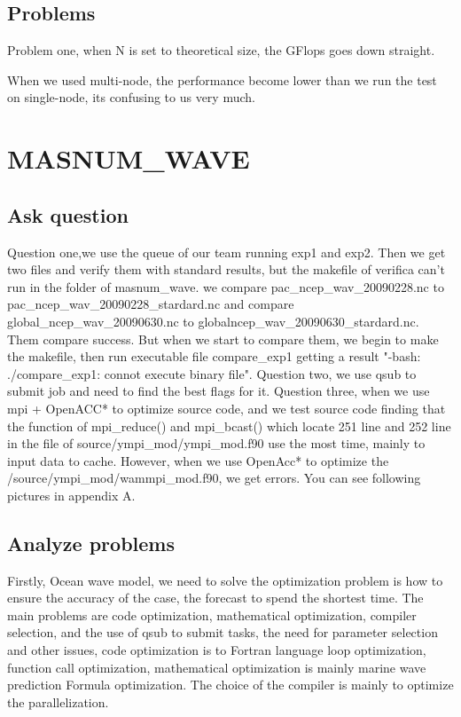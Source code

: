 \documentclass[conference,compsoc]{appendix/report}
\begin{document}
\subsection{Problems}
Problem one, when N is set to theoretical size, the GFlops goes down straight. 

When we used multi-node, the performance become lower than we run the test on single-node, its confusing to us very much.


\section{MASNUM\_WAVE}
\subsection{Ask question}
Question one,we use the queue of our team running exp1 and exp2. Then we get two files and verify them with standard results, but the makefile of verifica can't run in the folder of masnum\_wave. we compare pac\_ncep\_wav\_20090228.nc to pac\_ncep\_wav\_20090228\_stardard.nc and compare global\_ncep\_wav\_20090630.nc to globalncep\_wav\_20090630\_stardard.nc. Them compare success. But when we start to compare them, we begin to make the makefile, then run executable file compare\_exp1 getting a result "-bash: ./compare\_exp1: connot execute binary file". 
Question two, we use qsub to submit job and need to find the best flags for it.
Question three, when we use mpi + OpenACC* to optimize source code, and we test source code finding that the function of mpi\_reduce() and mpi\_bcast() which locate 251 line and 252 line in the file of source/ympi\_mod/ympi\_mod.f90 use the most time, mainly to input data to cache. However, when we use OpenAcc* to optimize the /source/ympi\_mod/wammpi\_mod.f90, we get errors. You can see following pictures in appendix A.

\subsection{Analyze problems}
Firstly,  Ocean wave model, we need to solve the optimization problem is how to ensure the accuracy of the case, the forecast to spend the shortest time. The main problems are code optimization, mathematical optimization, compiler selection, and the use of qsub to submit tasks, the need for parameter selection and other issues, code optimization is to Fortran language loop optimization, function call optimization, mathematical optimization is mainly marine wave prediction Formula optimization. The choice of the compiler is mainly to optimize the parallelization.
\end{document}
